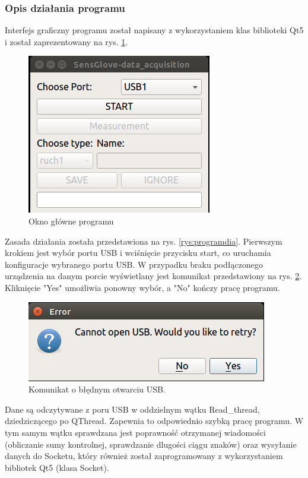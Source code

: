 \documentclass{article}
\begin{document}
\subsubsection{Opis działania programu}

Interfejs graficzny programu został napisany z wykorzystaniem klas biblioteki Qt5 i został zaprezentowany na rys. \ref{rys:okno}. 
\begin{figure}[H]
    \centering
    \includegraphics[scale=0.6]{okno.png}
    \caption{Okno główne programu}
    \label{rys:okno}
\end{figure}

Zasada działania została przedstawiona na rys. \ref{rys:programdia}. 
Pierwszym krokiem jest wybór portu USB i wciśnięcie przycisku start, co uruchamia konfiguracje wybranego portu USB. W przypadku braku podłączonego urządzenia na danym porcie wyświetlany jest komunikat przedstawiony na rys. \ref{rys:oknousb}. Kliknięcie "Yes" umożliwia ponowny wybór, a "No" kończy pracę programu.\\
\begin{figure}[H]
    \begin{center}
    \includegraphics[scale=0.6]{oknousb.png}
    \caption{Komunikat o błędnym otwarciu USB.}
    \label{rys:oknousb}
    \end{center}
\end{figure}
Dane są odczytywane z poru USB w oddzielnym wątku Read\_thread, dziedziczącego po QThread. Zapewnia to odpowiednio szybką pracę programu. W tym samym wątku sprawdzana jest poprawność otrzymanej wiadomości (obliczanie sumy kontrolnej, sprawdzanie dlugości ciągu znaków) oraz wysyłanie danych do Socketu, który również został zaprogramowany z wykorzystaniem bibliotek Qt5 (klasa Socket).
\end{document}
